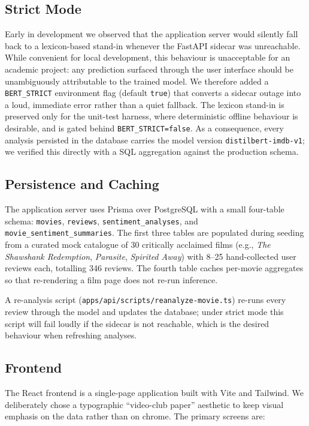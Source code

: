 \documentclass[11pt, a4paper]{article}
\begin{document}
\subsection{Strict Mode}

Early in development we observed that the application server would silently fall back to a lexicon-based stand-in whenever the FastAPI sidecar was unreachable. While convenient for local development, this behaviour is unacceptable for an academic project: any prediction surfaced through the user interface should be unambiguously attributable to the trained model. We therefore added a \texttt{BERT\_STRICT} environment flag (default \texttt{true}) that converts a sidecar outage into a loud, immediate error rather than a quiet fallback. The lexicon stand-in is preserved only for the unit-test harness, where deterministic offline behaviour is desirable, and is gated behind \texttt{BERT\_STRICT=false}. As a consequence, every analysis persisted in the database carries the model version \texttt{distilbert-imdb-v1}; we verified this directly with a SQL aggregation against the production schema.

\subsection{Persistence and Caching}

The application server uses Prisma over PostgreSQL with a small four-table schema: \texttt{movies}, \texttt{reviews}, \texttt{sentiment\_analyses}, and \texttt{movie\_sentiment\_summaries}. The first three tables are populated during seeding from a curated mock catalogue of 30 critically acclaimed films (e.g., \emph{The Shawshank Redemption}, \emph{Parasite}, \emph{Spirited Away}) with 8--25 hand-collected user reviews each, totalling 346 reviews. The fourth table caches per-movie aggregates so that re-rendering a film page does not re-run inference.

A re-analysis script (\texttt{apps/api/scripts/reanalyze-movie.ts}) re-runs every review through the model and updates the database; under strict mode this script will fail loudly if the sidecar is not reachable, which is the desired behaviour when refreshing analyses.

\subsection{Frontend}

The React frontend is a single-page application built with Vite and Tailwind. We deliberately chose a typographic ``video-club paper'' aesthetic to keep visual emphasis on the data rather than on chrome. The primary screens are:
\end{document}
